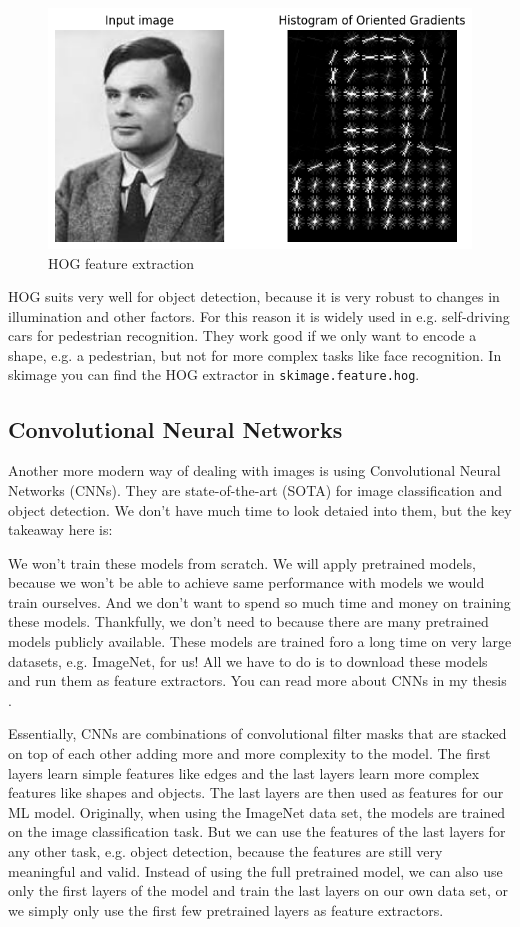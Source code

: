 \begin{figure}[h]
  \centering
  \includegraphics[width=.95\textwidth]{images/hog.png}
  \caption{HOG feature extraction}
  \label{fig:hog}
\end{figure}

HOG suits very well for object detection, because it is very robust to changes in illumination and other factors.
For this reason it is widely used in e.g. self-driving cars for pedestrian recognition.
They work good if we only want to encode a shape, e.g. a pedestrian, but not for more complex tasks like face recognition.
In skimage you can find the HOG extractor in \lstinline{skimage.feature.hog}.

\subsection{Convolutional Neural Networks}
Another more modern way of dealing with images is using Convolutional Neural Networks (CNNs).
They are state-of-the-art (SOTA) for image classification and object detection.
We don't have much time to look detaied into them, but the key takeaway here is:

We won't train these models from scratch. We will apply pretrained models, because we won't
be able to achieve same performance with models we would train ourselves.
And we don't want to spend so much time and money on training these models.
Thankfully, we don't need to because there are many pretrained models publicly available.
These models are trained foro a long time on very large datasets, e.g. ImageNet\cite{deng2009imagenet}, for us!
All we have to do is to download these models and run them as feature extractors.
You can read more about CNNs in my thesis \cite{PhilippZettl:2022}.


Essentially, CNNs are combinations of convolutional filter masks that are stacked on top of each other adding more and more complexity to the model.
The first layers learn simple features like edges and the last layers learn more complex features like shapes and objects.
The last layers are then used as features for our ML model.
Originally, when using the ImageNet data set, the models are trained on the image classification task.
But we can use the features of the last layers for any other task, e.g. object detection, because the features are still very meaningful and valid.
Instead of using the full pretrained model, we can also use only the first layers of the model and train the last layers on our own data set, or we simply
only use the first few pretrained layers as feature extractors.

